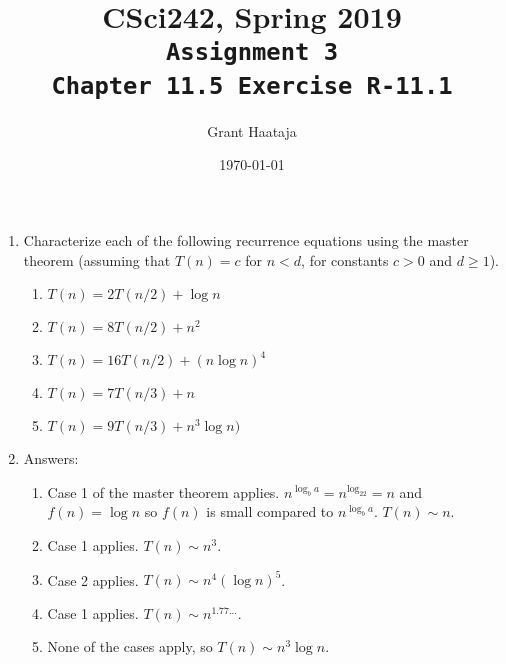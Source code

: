 \documentclass[11pt,final,twoside]{article} %
\title{CSci242, Spring 2019\\
	\texttt{Assignment 3\\
	\texttt{Chapter 11.5 Exercise R-11.1}}}
\author{Grant Haataja}
\date{\today}
\begin{document}
	\maketitle

\begin{enumerate}
	\item Characterize each of the following recurrence equations using the master theorem
	(assuming that $T(n) = c$ for $n < d$, for constants $c > 0$ and $d \geq 1$).
	\begin{enumerate}
		\item $T(n) = 2T(n/2) + \log n$
		\item $T(n) = 8T(n/2) + n^2$
		\item $T(n) = 16T(n/2) + (n\log n)^4$
		\item $T(n) = 7T(n/3) + n$
		\item $T(n) = 9T(n/3) + n^3\log n)$ 	
	\end{enumerate}
	\item Answers:
	\begin{enumerate}
		\item Case 1 of the master theorem applies. $n^{\log_ba} = n^{\log_22} = n$ and $f(n) = \log n$ so $f(n)$ is small compared to $n^{\log_ba}$. $T(n) \sim n$.
		\item Case 1 applies. $T(n) \sim n^3$.
		\item Case 2 applies. $T(n) \sim n^4(\log n)^5$.
		\item Case 1 applies. $T(n) \sim n^{1.77...}$.
		\item None of the cases apply, so $T(n) \sim n^3\log n$.
	\end{enumerate}
\end{enumerate}
	
\end{document}
